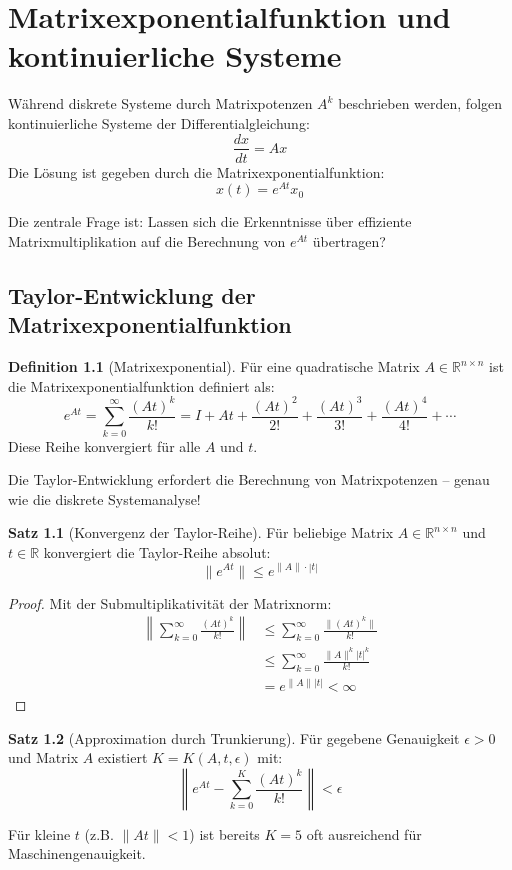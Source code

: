 ﻿\documentclass[a4paper,12pt]{report}
\theoremstyle{definition}
\newtheorem{definition}{Definition}
\newtheorem{satz}{Satz}
\begin{document}
	\chapter{Matrixexponentialfunktion und kontinuierliche Systeme}
	
	Während diskrete Systeme durch Matrixpotenzen $A^k$ beschrieben werden, folgen kontinuierliche Systeme der Differentialgleichung:
	\[
	\frac{dx}{dt} = A x
	\]
	Die Lösung ist gegeben durch die Matrixexponentialfunktion:
	\[
	x(t) = e^{At} x_0
	\]
	
	Die zentrale Frage ist: Lassen sich die Erkenntnisse über effiziente Matrixmultiplikation auf die Berechnung von $e^{At}$ übertragen?
	
	\section{Taylor-Entwicklung der Matrixexponentialfunktion}
	
	\begin{definition}[Matrixexponential]
		Für eine quadratische Matrix $A \in \mathbb{R}^{n \times n}$ ist die Matrixexponentialfunktion definiert als:
		\[
		e^{At} = \sum_{k=0}^{\infty} \frac{(At)^k}{k!} = I + At + \frac{(At)^2}{2!} + \frac{(At)^3}{3!} + \frac{(At)^4}{4!} + \cdots
		\]
		Diese Reihe konvergiert für alle $A$ und $t$.
	\end{definition}
	
	Die Taylor-Entwicklung erfordert die Berechnung von Matrixpotenzen -- genau wie die diskrete Systemanalyse!
	
	\begin{satz}[Konvergenz der Taylor-Reihe]
		Für beliebige Matrix $A \in \mathbb{R}^{n \times n}$ und $t \in \mathbb{R}$ konvergiert die Taylor-Reihe absolut:
		\[
		\|e^{At}\| \leq e^{\|A\| \cdot |t|}
		\]
	\end{satz}
	
	\begin{proof}
		Mit der Submultiplikativität der Matrixnorm:
		\begin{align}
			\left\| \sum_{k=0}^{\infty} \frac{(At)^k}{k!} \right\| &\leq \sum_{k=0}^{\infty} \frac{\|(At)^k\|}{k!} \\
			&\leq \sum_{k=0}^{\infty} \frac{\|A\|^k |t|^k}{k!} \\
			&= e^{\|A\| |t|} < \infty
		\end{align}
	\end{proof}
	
	\begin{satz}[Approximation durch Trunkierung]
		Für gegebene Genauigkeit $\epsilon > 0$ und Matrix $A$ existiert $K = K(A, t, \epsilon)$ mit:
		\[
		\left\| e^{At} - \sum_{k=0}^{K} \frac{(At)^k}{k!} \right\| < \epsilon
		\]
		
		Für kleine $t$ (z.B. $\|At\| < 1$) ist bereits $K = 5$ oft ausreichend für Maschinengenauigkeit.
	\end{satz}
	
\end{document}
